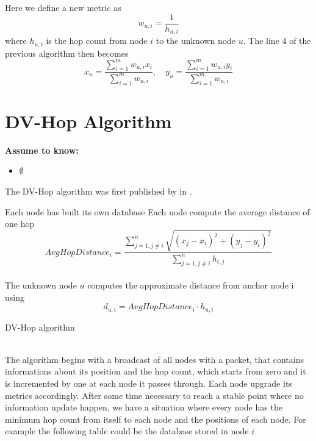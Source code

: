 \documentclass[12pt]{report}
\begin{document}
Here we define a new metric as 
\begin{equation}
    w_{u,i}=\frac{1}{h_{u,i}}
\end{equation}
where $h_{u,i}$ is the hop count from node $i$ to the unknown node $u$. The line 4 of the previous algorithm then becomes
\begin{equation}
     x_u=\frac{\sum_{i=1}^mw_{u,i}x_i}{\sum_{i=1}^mw_{u,i}},\quad y_u=\frac{\sum_{i=1}^mw_{u,i}y_i}{\sum_{i=1}^mw_{u,i}}
\end{equation}








\clearpage

\section{DV-Hop Algorithm}
  \begin{center}
  \textbf{Assume to know:}
  \begin{itemize}
    \centering
    \item $\emptyset$
  \end{itemize}
  \end{center}
The DV-Hop algorithm was first published by in \cite{965964}.\\
\begin{algorithm}[H]
\SetAlgoLined
{}
Each node has built its own database\;
Each node compute the average distance of one hop
\begin{equation}
    AvgHopDistance_i=\frac{\sum_{j=1,j\neq i}^n\sqrt{(x_j-x_i)^2+(y_j-y_i)^2}}{\sum_{j=1,j\neq i}^nh_{i,j}}
\end{equation}\\
The unknown node $u$ computes the approximate distance from anchor node i using 
\begin{equation}
    d_{u,i}=AvgHopDistance_i \cdot h_{u,i}
    \label{eq:19}
\end{equation}
 \caption{DV-Hop algorithm}
\end{algorithm}
\noindent\\
The algorithm begins with a broadcast of all nodes with a packet, that contains informations about its position and the hop count, which starts from zero and it is incremented by one at each node it passes through. Each node upgrade its metrics accordingly. After some time necessary to reach a stable point where no information update happen, we have a situation where every node has the minimum hop count from itself to each node and the positions of each node. For example the following table could be the database stored in node $i$
\end{document}
